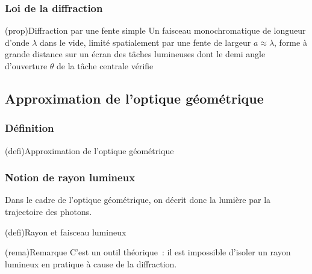 \documentclass[../../main/main.tex]{subfiles}
\begin{document}
\subsubsection{Loi de la diffraction}

\begin{tcb}[label=prop:loidiff](prop){Diffraction par une fente simple}
	Un faisceau monochromatique de longueur d'onde $\lambda$ dans le vide,
	limité spatialement par une fente de largeur $a \approx \lambda$, forme à
	grande distance sur un écran des tâches lumineuses dont le demi angle
	d'ouverture $\theta$ de la tâche centrale vérifie
	\psw{
		\[
			\boxed{\sin(\theta) = \frac{\lambda}{a}}
		\]
	}
	\vspace*{-10pt}
\end{tcb}

\subsection{Approximation de l'optique géométrique}

\subsubsection{Définition}

\begin{tcb}[label=def:optgeo](defi){Approximation de l'optique géométrique}
\end{tcb}

\subsubsection{Notion de rayon lumineux}

Dans le cadre de l'optique géométrique, on décrit donc la lumière par la
trajectoire des photons.

\begin{tcb}[cnt, bld, label=def:rl](defi){Rayon et faisceau lumineux}
\end{tcb}
\begin{tcb}(rema){Remarque}
	C'est un outil théorique~: il est impossible d'isoler un rayon lumineux
	en pratique à cause de la diffraction.
\end{tcb}
\end{document}
